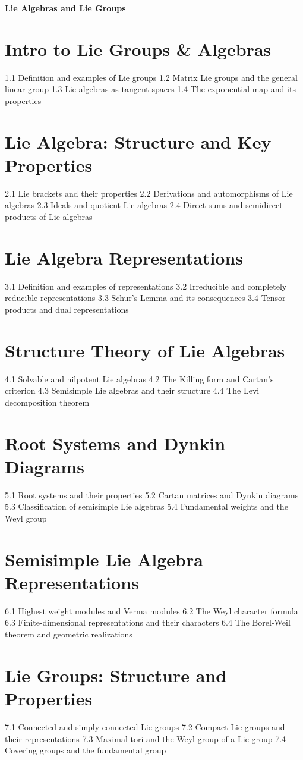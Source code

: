 {\LARGE \bf{Lie Algebras and Lie Groups}}
\section{Intro to Lie Groups \& Algebras}
1.1 Definition and examples of Lie groups
1.2 Matrix Lie groups and the general linear group
1.3 Lie algebras as tangent spaces
1.4 The exponential map and its properties
\section{Lie Algebra: Structure and Key Properties}
2.1 Lie brackets and their properties
2.2 Derivations and automorphisms of Lie algebras
2.3 Ideals and quotient Lie algebras
2.4 Direct sums and semidirect products of Lie algebras
\section{Lie Algebra Representations}
3.1 Definition and examples of representations
3.2 Irreducible and completely reducible representations
3.3 Schur's Lemma and its consequences
3.4 Tensor products and dual representations
\section{Structure Theory of Lie Algebras}
4.1 Solvable and nilpotent Lie algebras
4.2 The Killing form and Cartan's criterion
4.3 Semisimple Lie algebras and their structure
4.4 The Levi decomposition theorem
\section{Root Systems and Dynkin Diagrams}
5.1 Root systems and their properties
5.2 Cartan matrices and Dynkin diagrams
5.3 Classification of semisimple Lie algebras
5.4 Fundamental weights and the Weyl group
\section{Semisimple Lie Algebra Representations}
6.1 Highest weight modules and Verma modules
6.2 The Weyl character formula
6.3 Finite-dimensional representations and their characters
6.4 The Borel-Weil theorem and geometric realizations
\section{Lie Groups: Structure and Properties}
7.1 Connected and simply connected Lie groups
7.2 Compact Lie groups and their representations
7.3 Maximal tori and the Weyl group of a Lie group
7.4 Covering groups and the fundamental group
